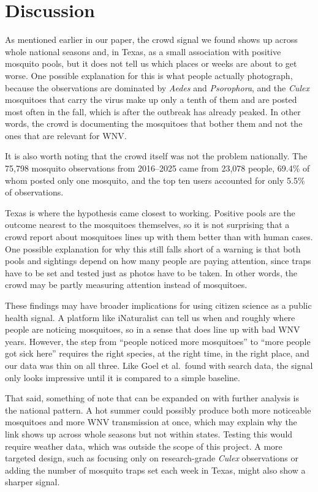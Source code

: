 \documentclass[11pt]{article}
\begin{document}
\FloatBarrier
\section{Discussion}
As mentioned earlier in our paper, the crowd signal we found shows up across whole national seasons and, in Texas, as a small association with positive mosquito pools, but it does not tell us which places or weeks are about to get worse. One possible explanation for this is what people actually photograph, because the observations are dominated by \textit{Aedes} and \textit{Psorophora}, and the \textit{Culex} mosquitoes that carry the virus make up only a tenth of them and are posted most often in the fall, which is after the outbreak has already peaked. In other words, the crowd is documenting the mosquitoes that bother them and not the ones that are relevant for WNV.

It is also worth noting that the crowd itself was not the problem nationally. The 75,798 mosquito observations from 2016--2025 came from 23,078 people, 69.4\% of whom posted only one mosquito, and the top ten users accounted for only 5.5\% of observations.

Texas is where the hypothesis came closest to working. Positive pools are the outcome nearest to the mosquitoes themselves, so it is not surprising that a crowd report about mosquitoes lines up with them better than with human cases. One possible explanation for why this still falls short of a warning is that both pools and sightings depend on how many people are paying attention, since traps have to be set and tested just as photos have to be taken. In other words, the crowd may be partly measuring attention instead of mosquitoes.

These findings may have broader implications for using citizen science as a public health signal. A platform like iNaturalist can tell us when and roughly where people are noticing mosquitoes, so in a sense that does line up with bad WNV years. However, the step from ``people noticed more mosquitoes'' to ``more people got sick here'' requires the right species, at the right time, in the right place, and our data was thin on all three. Like Goel et al.\ found with search data, the signal only looks impressive until it is compared to a simple baseline.\cite{goel2010}

That said, something of note that can be expanded on with further analysis is the national pattern. A hot summer could possibly produce both more noticeable mosquitoes and more WNV transmission at once, which may explain why the link shows up across whole seasons but not within states. Testing this would require weather data, which was outside the scope of this project. A more targeted design, such as focusing only on research-grade \textit{Culex} observations or adding the number of mosquito traps set each week in Texas, might also show a sharper signal.
\end{document}
